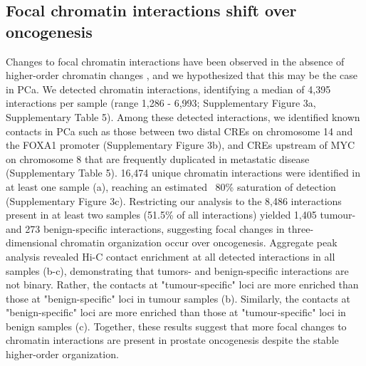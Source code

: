 \subsection{Focal chromatin interactions shift over oncogenesis}

Changes to focal chromatin interactions have been observed in the absence of higher-order chromatin changes \cite{takayamaTransitionQuiescentActivated2021,johnstoneLargeScaleTopologicalChanges2020}, and we hypothesized that this may be the case in PCa.
We detected chromatin interactions, identifying a median of 4,395 interactions per sample (range 1,286 - 6,993; Supplementary Figure 3a, Supplementary Table 5).
Among these detected interactions, we identified known contacts in PCa such as those between two distal CREs on chromosome 14 and the FOXA1 promoter \cite{zhouNoncodingMutationsTarget2020} (Supplementary Figure 3b), and CREs upstream of MYC on chromosome 8 that are frequently duplicated in metastatic disease \cite{quigleyGenomicHallmarksStructural2018} (Supplementary Table 5).
16,474 unique chromatin interactions were identified in at least one sample (a), reaching an estimated ~80\% saturation of detection (Supplementary Figure 3c).
Restricting our analysis to the 8,486 interactions present in at least two samples (51.5\% of all interactions) yielded 1,405 tumour- and 273 benign-specific interactions, suggesting focal changes in three-dimensional chromatin organization occur over oncogenesis.
Aggregate peak analysis revealed Hi-C contact enrichment at all detected interactions in all samples (b-c), demonstrating that tumors- and benign-specific interactions are not binary.
Rather, the contacts at "tumour-specific" loci are more enriched than those at "benign-specific" loci in tumour samples (b).
Similarly, the contacts at "benign-specific" loci are more enriched than those at "tumour-specific" loci in benign samples (c).
Together, these results suggest that more focal changes to chromatin interactions are present in prostate oncogenesis despite the stable higher-order organization.


